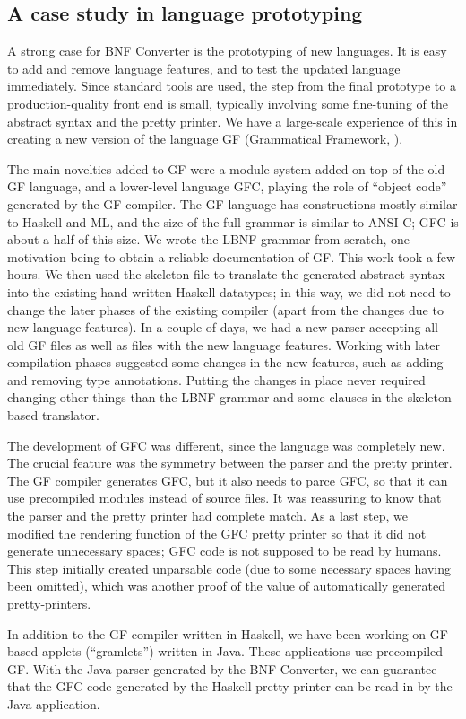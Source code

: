 \subsection{A case study in language prototyping}

A strong case for BNF Converter is the prototyping of new
languages. It is easy to add and remove language
features, and to test the updated language immediately.
Since standard tools are used, the step from the final 
prototype to a production-quality front end is small,
typically involving some fine-tuning of the abstract
syntax and the pretty printer. We have a large-scale
experience of this in creating a new version of the
language GF (Grammatical Framework, \cite{GF-paper}). 

The main novelties added to GF were 
a module system added on top of the old GF language, 
and a lower-level language GFC, playing the role of 
``object code'' generated by the GF compiler. 
The GF language has constructions mostly similar to Haskell and ML,
and the size of the full grammar is similar
to ANSI C; GFC is about a half of this size. 
We wrote the LBNF grammar from scratch, one motivation
being to obtain a reliable documentation of GF. 
This work took a few hours. We then used the skeleton file
to translate the generated abstract syntax into the existing
hand-written Haskell datatypes; in this way, we did not 
need to change the later phases of the existing compiler (apart from
the changes due to new language features). In a couple of days,
we had a new parser accepting all old GF files as well as 
files with the new language features. Working with later compilation
phases suggested some changes in the new features, such as adding
and removing type annotations. Putting the changes in place never required
changing other things than the LBNF grammar and some clauses in
the skeleton-based translator.

The development of GFC was different, since the language
was completely new. The crucial feature was the symmetry between
the parser and the pretty printer. The GF compiler generates 
GFC, but it also needs to parce GFC, so that it can use precompiled
modules instead of source files. It was reassuring to know
that the parser and the pretty printer had complete match.
As a last step, we modified the rendering function of the GFC
pretty printer so that it did not generate unnecessary spaces;
GFC code is not supposed to be read by humans. This step initially
created unparsable code (due to some necessary spaces having been
omitted), which was another proof of the value of automatically
generated pretty-printers.

In addition to the GF compiler written in Haskell, we have been
working on GF-based applets (``gramlets'') written in Java.
These applications use precompiled GF. With the Java parser
generated by the BNF Converter, we can guarantee that the GFC code generated
by the Haskell pretty-printer can be read in by the Java application.
